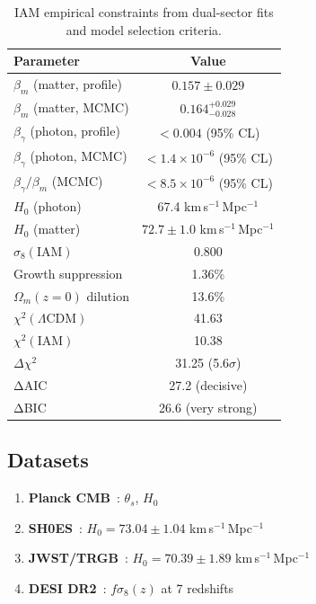 \documentclass[twocolumn,superscriptaddress,prl,amsmath,amssymb]{revtex4-2}
\begin{document}
\begin{table}[h]
\centering
\begin{tabular}{lc}
\hline\hline
Parameter & Value \\
\hline
$\beta_m$ (matter, profile) & $0.157 \pm 0.029$ \\
$\beta_m$ (matter, MCMC) & $0.164^{+0.029}_{-0.028}$ \\
$\beta_\gamma$ (photon, profile) & $< 0.004$ (95\% CL) \\
$\beta_\gamma$ (photon, MCMC) & $< 1.4 \times 10^{-6}$ (95\% CL) \\
$\beta_\gamma/\beta_m$ (MCMC) & $< 8.5 \times 10^{-6}$ (95\% CL) \\
\hline
$H_0$ (photon) & 67.4 km\,s$^{-1}$\,Mpc$^{-1}$ \\
$H_0$ (matter) & $72.7 \pm 1.0$ km\,s$^{-1}$\,Mpc$^{-1}$ \\
\hline
$\sigma_8(\text{IAM})$ & 0.800 \\
Growth suppression & 1.36\% \\
$\Omega_m(z=0)$ dilution & 13.6\% \\
\hline
$\chi^2(\Lambda\text{CDM})$ & 41.63 \\
$\chi^2(\text{IAM})$ & 10.38 \\
$\Delta\chi^2$ & 31.25 (5.6$\sigma$) \\
\hline
ΔAIC & 27.2 (decisive) \\
ΔBIC & 26.6 (very strong) \\
\hline\hline
\end{tabular}
\caption{IAM empirical constraints from dual-sector fits and model selection criteria.}
\label{tab:results}
\end{table}

\subsection{Datasets}

\begin{enumerate}
\item \textbf{Planck CMB}~\cite{PlanckCollaboration2020}: $\theta_s$, $H_0$
\item \textbf{SH0ES}~\cite{Riess2022}: $H_0 = 73.04 \pm 1.04$ km\,s$^{-1}$\,Mpc$^{-1}$
\item \textbf{JWST/TRGB}~\cite{Freedman2024}: $H_0 = 70.39 \pm 1.89$ km\,s$^{-1}$\,Mpc$^{-1}$
\item \textbf{DESI DR2}~\cite{DESI2024}: $f\sigma_8(z)$ at 7 redshifts
\end{enumerate}
\end{document}
